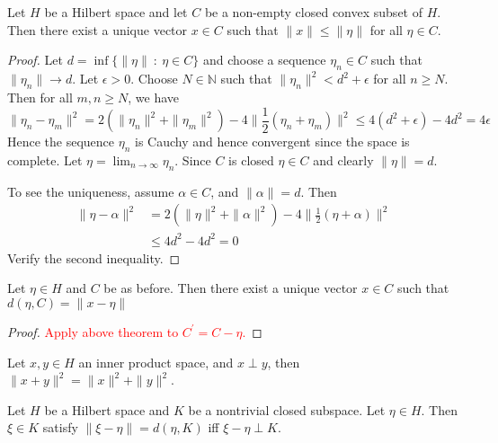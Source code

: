 
\chapter{}

\begin{theorem}
  Let $H$ be a Hilbert space and let $C$ be a non-empty closed convex
  subset of $H$. Then there exist a unique vector $x \in C$ such that
  $\|x\| \le \|\eta\|$ for all $\eta \in C$.
\end{theorem}
\begin{proof}
  Let $d = \inf \{ \|\eta\|  \ : \ \eta \in C  \}$ and choose a
  sequence $ \eta_n \in C$  such that $\|\eta_n\| \to d$. Let $
  \epsilon > 0$. Choose $N \in \mathbb{N}$ such that $\|\eta_n\|^2 <
  d^2 + \epsilon$ for all $n \ge N$. Then for all $m,n \ge N$, we have \[
    \|\eta_n - \eta_m\|^2 = 2(\|\eta_n\|^2 + \|\eta_m\|^2) - 4 \|
    \frac{1}{2}(\eta_n + \eta_m) \|^2 \le 4(d^2  + \epsilon) - 4d^2 = 4 \epsilon
  \]
  Hence the sequence $\eta_n$ is Cauchy and hence convergent since
  the space is complete. Let $\eta = \lim_{n \to \infty} \eta_n$.
  Since $C$ is closed $\eta \in C$ and clearly $\|\eta\| = d$.

  To see the uniqueness, assume $\alpha \in C$, and $\| \alpha\| = d$. Then
  \begin{align*}
    \|\eta - \alpha\|^2 &= 2(\|\eta\|^2 + \|\alpha\|^2) - 4 \|
    \frac{1}{2}(\eta + \alpha) \|^2 \\
    & \le 4d^2 - 4d^2 = 0
  \end{align*}
  Verify the second inequality.
\end{proof}

\begin{corollary}
  Let $\eta \in H$ and $C$ be as before. Then there exist a unique
  vector $x \in C$ such that $d(\eta, C) = \|x - \eta\|$
\end{corollary}
\begin{proof}
  \textcolor{red}{Apply above theorem to $C^\prime = C - \eta$.}
\end{proof}

\begin{proposition}
  Let $ x, y \in H$ an inner product space, and $x \perp y$, then
  $\|x + y\|^2 = \|x\|^2 + \|y\|^2$.
\end{proposition}

\begin{lemma}
  \label{lem:15}
  Let $H$ be a Hilbert space and $K$ be a nontrivial closed subspace.
  Let $\eta \in H$. Then $\xi \in K$ satisfy $\|\xi - \eta\| = d(\eta, K)$ iff
  $\xi - \eta \perp K$.
\end{lemma}

